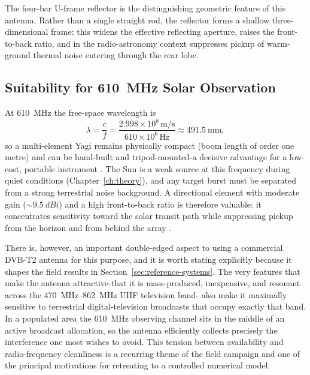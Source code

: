 The four-bar U-frame reflector is the distinguishing geometric feature of this
antenna. Rather than a single straight rod, the reflector forms a shallow
three-dimensional frame: this widens the effective reflecting aperture, raises
the front-to-back ratio, and in the radio-astronomy context suppresses pickup of
warm-ground thermal noise entering through the rear lobe.

\subsection{Suitability for \texorpdfstring{\SI{610}{\mega\hertz}}{610 MHz}
Solar Observation}
\label{subsec:suitability}

At \SI{610}{\mega\hertz} the free-space wavelength is
\begin{equation}
    \lambda = \frac{c}{f} = \frac{2.998\times10^{8}\,\si{\metre\per\second}}
                                 {610\times10^{6}\,\si{\hertz}}
            \approx \SI{491.5}{\milli\metre},
    \label{eq:wavelength}
\end{equation}
so a multi-element Yagi remains physically compact (boom length of order one
metre) and can be hand-built and tripod-mounted-a decisive advantage for a
low-cost, portable instrument \citep{balanis2016}. The Sun is a weak source at
this frequency during quiet conditions (Chapter~\ref{ch:theory}), and any
target burst must be separated from a strong terrestrial noise background. A
directional element with moderate gain ($\sim\!\SI{9.5}{dBi}$) and a high
front-to-back ratio is therefore valuable: it concentrates sensitivity toward
the solar transit path while suppressing pickup from the horizon and from
behind the array \citep{tms2017}.

There is, however, an important double-edged aspect to using a
commercial DVB-T2 antenna for this purpose, and it is worth stating explicitly
because it shapes the field results in Section~\ref{sec:reference-systems}. The very
features that make the antenna attractive-that it is mass-produced, inexpensive,
and resonant across the \SIrange{470}{862}{\mega\hertz} UHF television band-
also make it maximally sensitive to terrestrial digital-television broadcasts
that occupy exactly that band. In a populated area the \SI{610}{\mega\hertz}
observing channel sits in the middle of an active broadcast allocation, so the
antenna efficiently collects precisely the interference one most wishes to
avoid. This tension between availability and radio-frequency cleanliness is a
recurring theme of the field campaign and one of the principal motivations for
retreating to a controlled numerical model.


